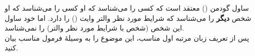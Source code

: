 ساول گودمن () معتقد است که کسی را می‌شناسد که او کسی را می‌شناسد که او شخص \textbf{دیگر} را می‌شناسد که شرایط مورد نظر والتر وایت () را دارد. اما خود ساول این شخص (شخص با شرایط مورد نظر والتر) را نمی‌شناسد.\\
پس از تعریف زبان مرتبه اول مناسب، این موضوع را به وسیلهٔ فرمول مناسب بیان کنید.\\
